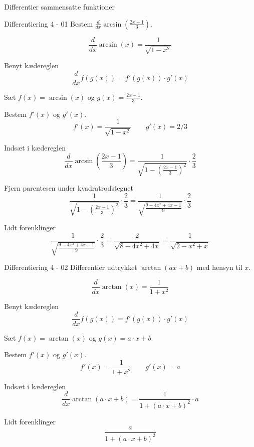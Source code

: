 \documentclass{article}
\begin{document}
Differentier sammensatte funktioner
\tableofcontents
\newpage


\begin{exercise}{Differentiering 4 - 01}
Bestem $\frac{d}{dx} \arcsin\left( \frac{2x-1}{3} \right)$.



\hint
\[
\frac{d}{dx} \arcsin(x) = \frac{1}{\sqrt{1 - x^ 2}}
\]


\hint
Benyt kædereglen
\[
\frac{d}{dx} f(g(x)) = f'(g(x)) \cdot g'(x)
\]

\hint
Sæt $f(x) = \arcsin(x)$ og $g(x) = \frac{2x - 1}{3}$.

\hint
Bestem $f'(x)$ og $g'(x)$.
\[
f'(x) = \frac{1}{\sqrt{1 - x^ 2}} \qquad g'(x) = 2/3
\]

\hint
Indsæt i kædereglen
\[
\frac{d}{dx} \arcsin\left( \frac{2x-1}{3} \right) = \frac{1}{\sqrt{1 - \left( \frac{2x - 1}{3} \right)^ 2}} \cdot \frac{2}{3}
\]

\hint
Fjern parentesen under kvadratrodstegnet
\[
\frac{1}{\sqrt{1 - \left( \frac{2x - 1}{3} \right)^ 2}} \cdot \frac{2}{3}
= \frac{1}{\sqrt{\frac{9 - 4x^2 + 4x - 1}{9}}} \cdot \frac{2}{3}
\]

\hint
Lidt forenklinger
\[
\frac{1}{\sqrt{\frac{9 - 4x^2 + 4x - 1}{9}}} \cdot \frac{2}{3}
= \frac{2}{\sqrt{8 - 4x^2 + 4x}}
= \frac{1}{\sqrt{2 - x^2 + x}}
\]
\end{exercise}

\begin{exercise}{Differentiering 4 - 02}
Differentier udtrykket $\arctan\left( a x + b \right)$ med hensyn til $x$.


\hint
\[
\frac{d}{dx} \arctan(x) = \frac{1}{1 + x^ 2}
\]


\hint
Benyt kædereglen
\[
\frac{d}{dx} f(g(x)) = f'(g(x)) \cdot g'(x)
\]

\hint
Sæt $f(x) = \arctan(x)$ og $g(x) = a \cdot x + b$.

\hint
Bestem $f'(x)$ og $g'(x)$.
\[
f'(x) = \frac{1}{1 + x^ 2} \qquad g'(x) = a
\]

\hint
Indsæt i kædereglen
\[
\frac{d}{dx} \arctan\left( a \cdot x + b \right) = \frac{1}{1 + \left( a \cdot x + b \right)^2} \cdot a
\]

\hint
Lidt forenklinger
\[
\frac{a}{1 + \left( a \cdot x + b \right)^2}
\]
\end{exercise}
\end{document}
